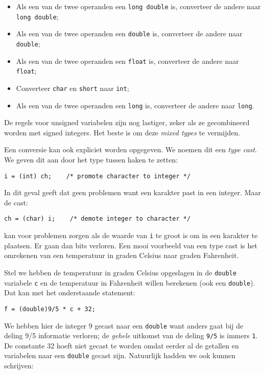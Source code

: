 \begin{itemize}
\item Als een van de twee operanden een \texttt{long double} is, converteer de andere naar \texttt{long double};
\item Als een van de twee operanden een \texttt{double} is, converteer de andere naar \texttt{double};
\item Als een van de twee operanden een \texttt{float} is, converteer de andere naar \texttt{float};
\item Converteer \texttt{char} en \texttt{short} naar \texttt{int};
\item Als een van de twee operanden een \texttt{long} is, converteer de andere naar \texttt{long}.
\end{itemize}

De regels voor unsigned variabelen zijn nog lastiger, zeker als ze gecombineerd worden met signed integers. Het beste is om deze \textsl{mixed types} te vermijden.

Een conversie kan ook expliciet worden opgegeven. We noemen dit een \textsl{type cast}. We geven dit aan door het type tussen haken te zetten:

\hspace*{1em}\texttt{i = (int) ch; \ \ \  /* promote character to integer */}

In dit geval geeft dat geen problemen want een karakter past in een integer. Maar de cast:

\hspace*{1em}\texttt{ch = (char) i; \ \ \  /* demote integer to character */}

kan voor problemen zorgen als de waarde van \texttt{i} te groot is om in een karakter te plaatsen. Er gaan dan bits verloren. Een mooi voorbeeld van een type cast is het omrekenen van een temperatuur in graden Celsius naar graden Fahrenheit. 

Stel we hebben de temperatuur in graden Celsius opgeslagen in de \texttt{double} variabele \texttt{c} en de temperatuur in Fahrenheit willen berekenen (ook een \texttt{double}). Dat kan met het onderstaande statement:

\hspace*{1em}\texttt{f = (double)9/5 * c + 32;}

We hebben hier de integer 9 gecast naar een \texttt{double} want anders gaat bij de deling 9/5 informatie verloren; de \textsl{gehele} uitkomst van de deling \texttt{9/5} is immers \texttt{1}. De constante 32 hoeft niet gecast te worden omdat eerder al de getallen en variabelen naar een \texttt{double} gecast zijn. Natuurlijk hadden we ook kunnen schrijven:

